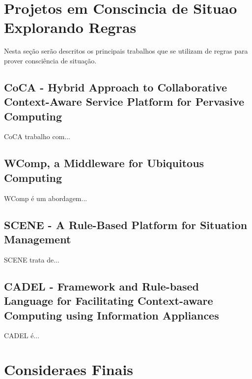 \documentclass[12pt,a4paper,compsoc]{IEEEtran}
\begin{document}

\section{Projetos em Conscincia de Situao Explorando Regras}

Nesta seção serão descritos os principais trabalhos que se utilizam de regras para prover consciência de situação.

\subsection{CoCA - Hybrid Approach to Collaborative Context-Aware Service Platform for Pervasive Computing}

CoCA trabalho com...

\subsection{WComp, a Middleware for Ubiquitous Computing}

WComp é um abordagem...

\subsection{SCENE - A Rule-Based Platform for Situation Management}

SCENE trata de...

\subsection{CADEL - Framework and Rule-based Language for Facilitating Context-aware Computing using Information Appliances}

CADEL é...


\section{Consideraes Finais}
\end{document}
